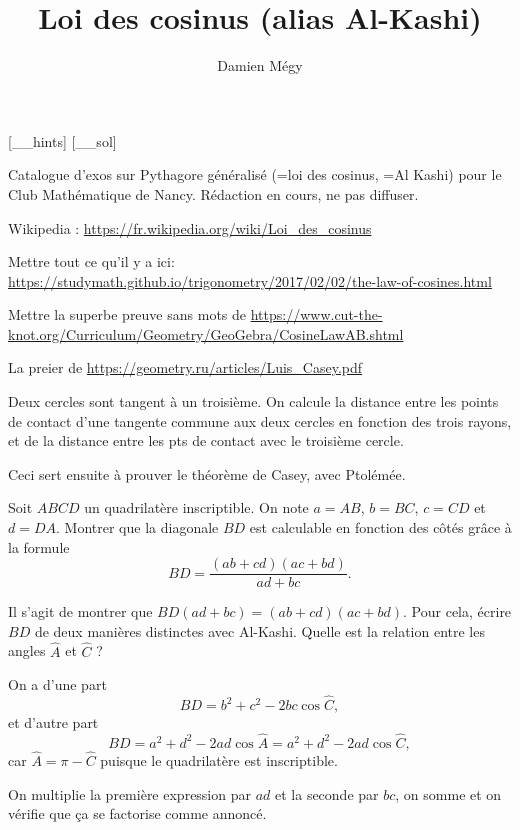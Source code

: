





[_\jobname_hints]
[_\jobname_sol]


\title{Loi des cosinus (alias Al-Kashi)}
\author{Damien Mégy}
\maketitle

Catalogue d'exos sur Pythagore généralisé (=loi des cosinus, =Al Kashi) pour le Club Mathématique de Nancy. Rédaction en cours, ne pas diffuser.

Wikipedia : \url{https://fr.wikipedia.org/wiki/Loi_des_cosinus}

Mettre tout ce qu'il y a ici: \url{https://studymath.github.io/trigonometry/2017/02/02/the-law-of-cosines.html}

Mettre la superbe preuve sans mots de \url{https://www.cut-the-knot.org/Curriculum/Geometry/GeoGebra/CosineLawAB.shtml}



\begin{exo}
La preier de \url{https://geometry.ru/articles/Luis_Casey.pdf}

Deux cercles sont tangent à un troisième. On calcule la distance entre les points de contact d'une tangente commune aux deux cercles en fonction  des trois rayons, et de la distance entre les pts de contact avec le troisième cercle.

Ceci sert ensuite à prouver le théorème de Casey, avec Ptolémée.
\end{exo}


\begin{exo}
Soit $ABCD$ un quadrilatère inscriptible. On note $a=AB$, $b=BC$, $c=CD$ et $d=DA$.
Montrer que la diagonale $BD$ est calculable en fonction des côtés grâce à la formule
\[ BD = \frac{(ab+cd)(ac+bd)}{ad+bc}.\]
\begin{hint}
Il s'agit de montrer que $BD(ad+bc) = (ab+cd)(ac+bd)$.
Pour cela, écrire  $BD$ de deux manières distinctes avec Al-Kashi. 
Quelle est la relation entre les angles $\widehat A$ et $\widehat C$ ?
\end{hint}
\begin{sol}
On a d'une part 
\[BD  = b^2+c^2-2bc\cos \widehat C,\]
et d'autre part 
\[ BD = a^2+d^2-2ad\cos\widehat A =a^2+d^2-2ad\cos\widehat C, \]
car $\widehat A = \pi - \widehat C$ puisque le quadrilatère est inscriptible.

On multiplie la première expression par $ad$ et la seconde par $bc$, on somme et on vérifie que ça se factorise comme annoncé.
\end{sol}
\end{exo}



